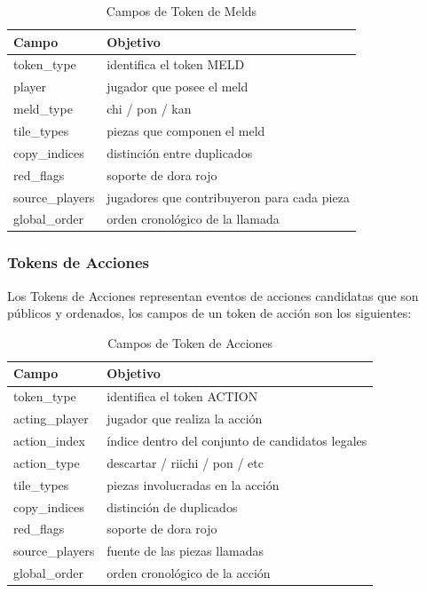 \begin{table}[]
\centering
\begin{tabular}{|l|l|}
\hline
\textbf{Campo}  & \textbf{Objetivo}                            \\ \hline
token\_type     & identifica el token MELD                    \\ \hline
player          & jugador que posee el meld                   \\ \hline
meld\_type      & chi / pon / kan                             \\ \hline
tile\_types     & piezas que componen el meld                 \\ \hline
copy\_indices   & distinción entre duplicados                 \\ \hline
red\_flags      & soporte de dora rojo                        \\ \hline
source\_players & jugadores que contribuyeron para cada pieza \\ \hline
global\_order   & orden cronológico de la llamada             \\ \hline
\end{tabular}
\caption{Campos de Token de Melds}
\label{tab:melds_token}
\end{table}


\subsubsection{Tokens de Acciones}

Los Tokens de Acciones representan eventos de acciones candidatas que son públicos y ordenados, los campos de un token de acción son los siguientes:

\begin{table}[H]
  \centering
  \begin{tabular}{|l|l|}
    \hline
    \textbf{Campo} & \textbf{Objetivo}         \\ \hline
    token\_type    & identifica el token ACTION    \\ \hline
    acting\_player & jugador que realiza la acción \\ \hline
    action\_index  & índice dentro del conjunto de candidatos legales \\ \hline
    action\_type   & descartar / riichi / pon / etc \\ \hline
    tile\_types    & piezas involucradas en la acción \\ \hline
    copy\_indices  & distinción de duplicados \\ \hline
    red\_flags     & soporte de dora rojo \\ \hline
    source\_players & fuente de las piezas llamadas \\ \hline
    global\_order  & orden cronológico de la acción \\ \hline
  \end{tabular}
  \caption{Campos de Token de Acciones}
  \label{tab:action_token}
  
\end{table}

